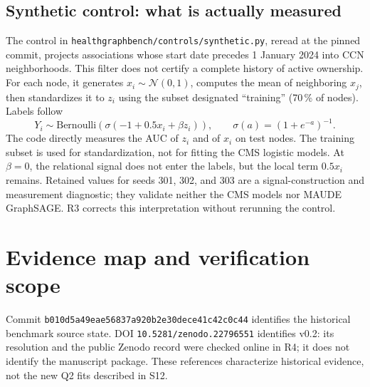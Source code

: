 \documentclass[10pt,a4paper]{article}
\newcommand{\src}[1]{{\small\nolinkurl{#1}}}
\begin{document}
\subsection{Synthetic control: what is actually measured}
\label{supp:control}
The control in \src{healthgraphbench/controls/synthetic.py}, reread at the pinned commit, projects associations whose start date precedes 1 January 2024 into CCN neighborhoods. This filter does not certify a complete history of active ownership. For each node, it generates $x_i\sim\mathcal N(0,1)$, computes the mean of neighboring $x_j$, then standardizes it to $z_i$ using the subset designated “training” (70\,\% of nodes). Labels follow
\[
Y_i\sim\mathrm{Bernoulli}\!\left(\sigma(-1+0.5x_i+\beta z_i)\right),
\qquad \sigma(a)=(1+e^{-a})^{-1}.
\]
The code directly measures the AUC of $z_i$ and of $x_i$ on test nodes. The training subset is used for standardization, not for fitting the CMS logistic models. At $\beta=0$, the relational signal does not enter the labels, but the local term $0.5x_i$ remains. Retained values for seeds 301, 302, and 303 are a signal-construction and measurement diagnostic; they validate neither the CMS models nor MAUDE GraphSAGE\cite{hgbcontrols}. R3 corrects this interpretation without rerunning the control.


\section{Evidence map and verification scope}
\label{supp:evidence}
Commit \nolinkurl{b010d5a49eae56837a920b2e30dece41c42c0c44} identifies the historical benchmark source state\cite{hgb2026,hgbresults}. DOI \nolinkurl{10.5281/zenodo.22796551} identifies v0.2: its resolution and the public Zenodo record were checked online in R4; it does not identify the manuscript package. These references characterize historical evidence, not the new Q2 fits described in S12.
\end{document}
